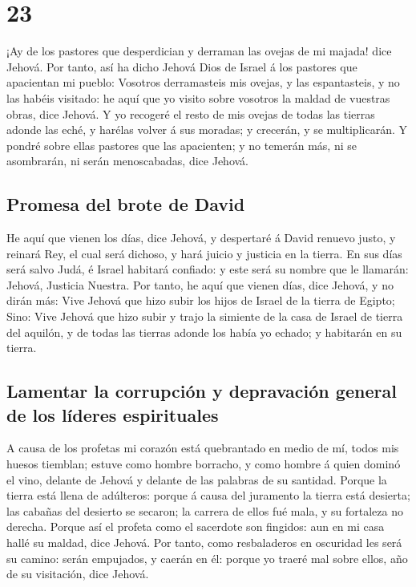 \hypertarget{section-22}{%
\section{23}\label{section-22}}

 ¡Ay de los pastores que desperdician y derraman las ovejas
de mi majada! dice Jehová.  Por tanto, así ha dicho Jehová
Dios de Israel á los pastores que apacientan mi pueblo: Vosotros
derramasteis mis ovejas, y las espantasteis, y no las habéis visitado:
he aquí que yo visito sobre vosotros la maldad de vuestras obras, dice
Jehová.  Y yo recogeré el resto de mis ovejas de todas las
tierras adonde las eché, y harélas volver á sus moradas; y crecerán, y
se multiplicarán.  Y pondré sobre ellas pastores que las
apacienten; y no temerán más, ni se asombrarán, ni serán menoscabadas,
dice Jehová.

\hypertarget{promesa-del-brote-de-david}{%
\subsection{Promesa del brote de
David}\label{promesa-del-brote-de-david}}

 He aquí que vienen los días, dice Jehová, y despertaré á
David renuevo justo, y reinará Rey, el cual será dichoso, y hará juicio
y justicia en la tierra.  En sus días será salvo Judá, é
Israel habitará confiado: y este será su nombre que le llamarán: Jehová,
Justicia Nuestra.  Por tanto, he aquí que vienen días, dice
Jehová, y no dirán más: Vive Jehová que hizo subir los hijos de Israel
de la tierra de Egipto;  Sino: Vive Jehová que hizo subir y
trajo la simiente de la casa de Israel de tierra del aquilón, y de todas
las tierras adonde los había yo echado; y habitarán en su tierra.

\hypertarget{lamentar-la-corrupciuxf3n-y-depravaciuxf3n-general-de-los-luxedderes-espirituales}{%
\subsection{Lamentar la corrupción y depravación general de los líderes
espirituales}\label{lamentar-la-corrupciuxf3n-y-depravaciuxf3n-general-de-los-luxedderes-espirituales}}

 A causa de los profetas mi corazón está quebrantado en
medio de mí, todos mis huesos tiemblan; estuve como hombre borracho, y
como hombre á quien dominó el vino, delante de Jehová y delante de las
palabras de su santidad.  Porque la tierra está llena de
adúlteros: porque á causa del juramento la tierra está desierta; las
cabañas del desierto se secaron; la carrera de ellos fué mala, y su
fortaleza no derecha.  Porque así el profeta como el
sacerdote son fingidos: aun en mi casa hallé su maldad, dice Jehová.
 Por tanto, como resbaladeros en oscuridad les será su
camino: serán empujados, y caerán en él: porque yo traeré mal sobre
ellos, año de su visitación, dice Jehová.

